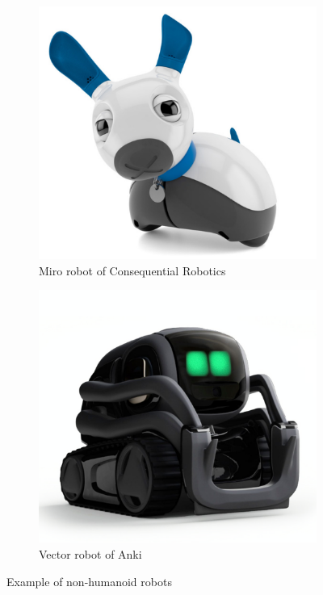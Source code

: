 \documentclass{thesisreport}
\begin{document}
\begin{figure}[H]
	\centering
	\begin{subfigure}{0.31\textwidth}
	    \includegraphics[width=\textwidth]{Thesis/data/miro.png}
         \caption{\centering Miro robot of Consequential Robotics}
        \label{fig:miro}
	\end{subfigure}
	\begin{subfigure}{0.31\textwidth}
		\includegraphics[width=\textwidth]{Thesis/data/vector.png}
		\caption{\centering Vector robot of Anki}
		\label{fig:vector}
	\end{subfigure}
\caption{Example of non-humanoid robots}
\label{fig:non-humanoid}	
\end{figure}
\end{document}
